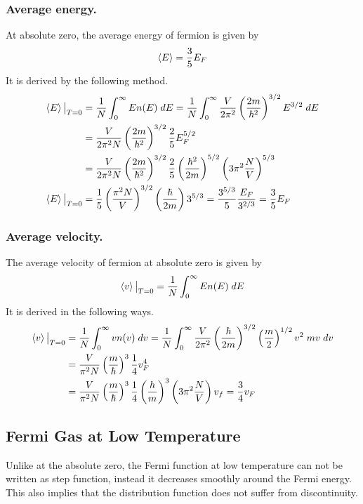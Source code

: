 \documentclass[../../../Main.tex]{subfiles}
\begin{document}
\subsubsection*{Average energy.} At absolute zero, the average energy of fermion is given by 
\begin{equation*}
    \braket{E}=\frac{3}{5}E_F
\end{equation*}
It is derived by the following method.
\begin{align*}
    \braket{E}\big|_{T=0}&= \frac{1}{N}\int_{0}^{\infty}En(E)\;dE =\frac{1}{N}\int_{0}^{\infty} \frac{V}{2\pi^2}\left(\frac{2m}{\hbar^2}\right)^{3/2}E^{3/2}\;dE\\
    &=\frac{V}{2\pi^2 N}\left(\frac{2m}{\hbar^2}\right)^{3/2}\frac{2}{5}E_F^{5/2}\\
    &=\frac{V}{2\pi^2 N}\left(\frac{2m}{\hbar^2}\right)^{3/2}\frac{2}{5}\left(\frac{\hbar^2}{2m}\right)^{5/2}\left(3\pi^2\frac{N}{V}\right)^{5/3}\\
    \braket{E}\big|_{T=0}&=\frac{1}{5}\left(\frac{\pi^2N}{V}\right)^{3/2}\left(\frac{\hbar}{2m}\right)3^{5/3}=\frac{3^{5/3}}{5}\frac{E_F}{3^{2/3}}=\frac{3}{5}E_F
\end{align*}

\subsubsection*{Average velocity.} The average velocity of fermion at absolute zero is given by 
\begin{equation*}
    \braket{v}\big|_{T=0}= \frac{1}{N}\int_{0}^{\infty}En(E)\;dE 
\end{equation*}
It is derived in the following ways.
\begin{align*}
    \braket{v}\big|_{T=0}&=\frac{1}{N}\int_{0}^{\infty}vn(v)\;dv=\frac{1}{N}\int_{0}^{\infty} \frac{V}{2\pi^2}\left(\frac{\hbar}{2m}\right)^{3/2}\left(\frac{m}{2}\right)^{1/2}v^2\;mv\;dv\\
    &=\frac{V}{\pi^2N}\left(\frac{m}{\hbar}\right)^3\frac{1}{4}v_F^4\\
    &=\frac{V}{\pi^2N}\left(\frac{m}{\hbar}\right)^3\frac{1}{4} \left(\frac{h}{m}\right)^3\left(3\pi^2\frac{N}{V}\right)v_f=\frac{3}{4}v_F
\end{align*}

\subsection*{Fermi Gas at Low Temperature}
Unlike at the absolute zero, the Fermi function at low temperature can not be written as step function, instead it decreases smoothly around the Fermi energy. This also implies that the distribution function does not suffer from discontinuity.
\end{document}
